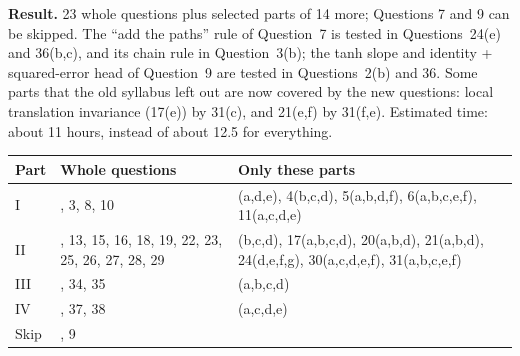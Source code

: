 \documentclass[12pt,a4paper]{article}
\begin{document}
\textbf{Result.} 23 whole questions plus selected parts of 14 more; Questions 7 and 9 can be skipped. The ``add the paths'' rule of Question~7 is tested in Questions~24(e) and 36(b,c), and its chain rule in Question~3(b); the tanh slope and identity + squared-error head of Question~9 are tested in Questions~2(b) and 36. Some parts that the old syllabus left out are now covered by the new questions: local translation invariance (17(e)) by 31(c), and 21(e,f) by 31(f,e). Estimated time: about 11 hours, instead of about 12.5 for everything.

\begin{center}
\begin{tabular}{@{}l>{\raggedright\arraybackslash}p{}>{\raggedright\arraybackslash}p{}@{}}
\toprule
Part & Whole questions & Only these parts\\
\midrule
I & 2, 3, 8, 10 & 1(a,d,e), 4(b,c,d), 5(a,b,d,f), 6(a,b,c,e,f), 11(a,c,d,e)\\
II & 12, 13, 15, 16, 18, 19, 22, 23, 25, 26, 27, 28, 29 & 14(b,c,d), 17(a,b,c,d), 20(a,b,d), 21(a,b,d), 24(d,e,f,g), 30(a,c,d,e,f), 31(a,b,c,e,f)\\
III & 32, 34, 35 & 33(a,b,c,d)\\
IV & 36, 37, 38 & 39(a,c,d,e)\\
\midrule
Skip & 7, 9 & \\
\bottomrule
\end{tabular}
\end{center}
\end{document}
